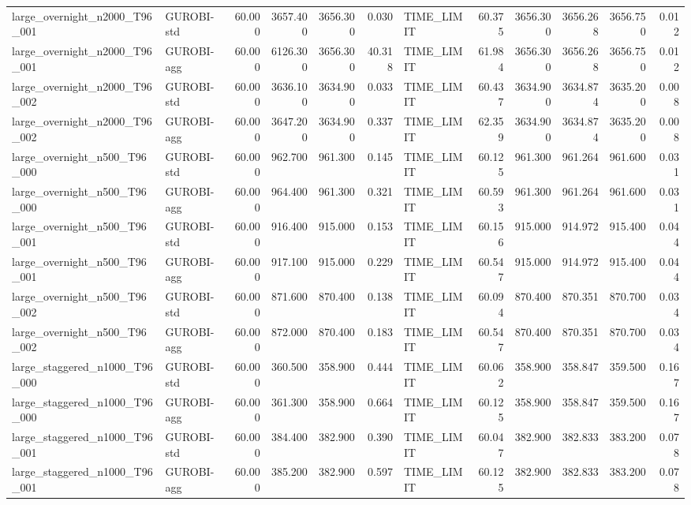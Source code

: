\begin{table}[htbp]
\begin{tabular}{llrrrrlrrrrr}
large\_overnight\_n2000\_T96\_001 & GUROBI-std & 60.000 & 3657.400 & 3656.300 & 0.030 & TIME\_LIMIT & 60.375 & 3656.300 & 3656.268 & 3656.750 & 0.012 \\
large\_overnight\_n2000\_T96\_001 & GUROBI-agg & 60.000 & 6126.300 & 3656.300 & 40.318 & TIME\_LIMIT & 61.984 & 3656.300 & 3656.268 & 3656.750 & 0.012 \\
large\_overnight\_n2000\_T96\_002 & GUROBI-std & 60.000 & 3636.100 & 3634.900 & 0.033 & TIME\_LIMIT & 60.437 & 3634.900 & 3634.874 & 3635.200 & 0.008 \\
large\_overnight\_n2000\_T96\_002 & GUROBI-agg & 60.000 & 3647.200 & 3634.900 & 0.337 & TIME\_LIMIT & 62.359 & 3634.900 & 3634.874 & 3635.200 & 0.008 \\
large\_overnight\_n500\_T96\_000 & GUROBI-std & 60.000 & 962.700 & 961.300 & 0.145 & TIME\_LIMIT & 60.125 & 961.300 & 961.264 & 961.600 & 0.031 \\
large\_overnight\_n500\_T96\_000 & GUROBI-agg & 60.000 & 964.400 & 961.300 & 0.321 & TIME\_LIMIT & 60.593 & 961.300 & 961.264 & 961.600 & 0.031 \\
large\_overnight\_n500\_T96\_001 & GUROBI-std & 60.000 & 916.400 & 915.000 & 0.153 & TIME\_LIMIT & 60.156 & 915.000 & 914.972 & 915.400 & 0.044 \\
large\_overnight\_n500\_T96\_001 & GUROBI-agg & 60.000 & 917.100 & 915.000 & 0.229 & TIME\_LIMIT & 60.547 & 915.000 & 914.972 & 915.400 & 0.044 \\
large\_overnight\_n500\_T96\_002 & GUROBI-std & 60.000 & 871.600 & 870.400 & 0.138 & TIME\_LIMIT & 60.094 & 870.400 & 870.351 & 870.700 & 0.034 \\
large\_overnight\_n500\_T96\_002 & GUROBI-agg & 60.000 & 872.000 & 870.400 & 0.183 & TIME\_LIMIT & 60.547 & 870.400 & 870.351 & 870.700 & 0.034 \\
large\_staggered\_n1000\_T96\_000 & GUROBI-std & 60.000 & 360.500 & 358.900 & 0.444 & TIME\_LIMIT & 60.062 & 358.900 & 358.847 & 359.500 & 0.167 \\
large\_staggered\_n1000\_T96\_000 & GUROBI-agg & 60.000 & 361.300 & 358.900 & 0.664 & TIME\_LIMIT & 60.125 & 358.900 & 358.847 & 359.500 & 0.167 \\
large\_staggered\_n1000\_T96\_001 & GUROBI-std & 60.000 & 384.400 & 382.900 & 0.390 & TIME\_LIMIT & 60.047 & 382.900 & 382.833 & 383.200 & 0.078 \\
large\_staggered\_n1000\_T96\_001 & GUROBI-agg & 60.000 & 385.200 & 382.900 & 0.597 & TIME\_LIMIT & 60.125 & 382.900 & 382.833 & 383.200 & 0.078 \\

\end{tabular}
\end{table}
